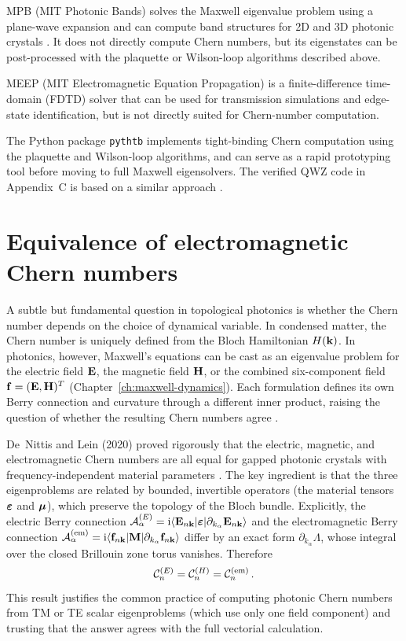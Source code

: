 MPB (MIT Photonic Bands) solves the Maxwell eigenvalue problem using a
plane-wave expansion and can compute band structures for 2D and 3D
photonic crystals
\cite{initio2026pdf}.  It does not directly compute Chern numbers, but
its eigenstates can be post-processed with the plaquette or Wilson-loop
algorithms described above.

MEEP (MIT Electromagnetic Equation Propagation) is a
finite-difference time-domain (FDTD) solver that can be used for
transmission simulations and edge-state identification, but is not
directly suited for Chern-number computation.

The Python package \texttt{pythtb} implements tight-binding Chern
computation using the plaquette and Wilson-loop algorithms, and can
serve as a rapid prototyping tool before moving to full Maxwell
eigensolvers.  The verified QWZ code in Appendix~C is based on a
similar approach \cite{ozawa2018topological,gangaraj2016berry}.

\section{Equivalence of electromagnetic Chern numbers}
\label{sec:ch10-em-chern-equivalence}

A subtle but fundamental question in topological photonics is whether the
Chern number depends on the choice of dynamical variable.  In condensed
matter, the Chern number is uniquely defined from the Bloch Hamiltonian
$H(\mathbf{k})$.  In photonics, however, Maxwell's equations can be cast as an
eigenvalue problem for the electric field $\mathbf{E}$, the magnetic field
$\mathbf{H}$, or the combined six-component field $\mathbf{f}=(\mathbf{E},\mathbf{H})^T$
(Chapter~\ref{ch:maxwell-dynamics}).  Each formulation defines its own Berry
connection and curvature through a different inner product, raising the
question of whether the resulting Chern numbers agree
\cite{nittis2020equivalence,raman2010photonic}.

De~Nittis and Lein (2020) proved rigorously that the electric, magnetic, and
electromagnetic Chern numbers are all equal for gapped photonic crystals with
frequency-independent material parameters \cite{nittis2020equivalence}.
The key ingredient is that the three eigenproblems are related by bounded,
invertible operators (the material tensors $\boldsymbol{\varepsilon}$ and $\boldsymbol{\mu}$), which
preserve the topology of the Bloch bundle.  Explicitly, the electric
Berry connection $\mathcal{A}^{(E)}_\alpha = \mathrm{i}\langle
\mathbf{E}_{n\mathbf{k}}|\boldsymbol{\varepsilon}|\partial_{k_\alpha}\mathbf{E}_{n\mathbf{k}}\rangle$
and the electromagnetic Berry connection
$\mathcal{A}^{(\mathrm{em})}_\alpha = \mathrm{i}\langle
\mathbf{f}_{n\mathbf{k}}|\mathbf{M}|\partial_{k_\alpha}\mathbf{f}_{n\mathbf{k}}\rangle$
differ by an exact form $\partial_{k_\alpha}\Lambda$, whose integral
over the closed Brillouin zone torus vanishes.  Therefore
\begin{equation}\label{eq:ch10-chern-equivalence}
  \mathcal{C}_n^{(E)} = \mathcal{C}_n^{(H)} = \mathcal{C}_n^{(\mathrm{em})}\,.
\end{equation}
This result justifies the common practice of computing photonic Chern
numbers from TM or TE scalar eigenproblems (which use only one field
component) and trusting that the answer agrees with the full vectorial
calculation.


